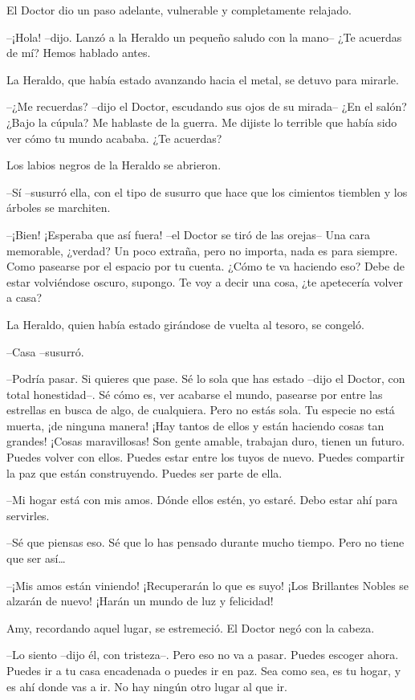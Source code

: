 {El Doctor dio un paso adelante, vulnerable y completamente relajado.}

{--¡Hola! --dijo. Lanzó a la Heraldo un pequeño saludo con la mano--
¿Te acuerdas de mí? Hemos hablado antes.}

{La Heraldo, que había estado avanzando hacia el metal, se detuvo para
mirarle.}

{--¿Me recuerdas? --dijo el Doctor, escudando sus ojos de su mirada--
	¿En el salón? ¿Bajo la cúpula? Me hablaste de la guerra. Me dijiste lo
terrible que había sido ver cómo tu mundo acababa. ¿Te acuerdas?}

{Los labios negros de la Heraldo se abrieron.}

{--Sí --susurró ella, con el tipo de susurro que hace que los
cimientos tiemblen y los árboles se marchiten.}

{--¡Bien! ¡Esperaba que así fuera! --el Doctor se tiró de las orejas--
	Una cara memorable, ¿verdad? Un poco extraña, pero no importa, nada es
	para siempre. Como pasearse por el espacio por tu cuenta. ¿Cómo te va
	haciendo eso? Debe de estar volviéndose oscuro, supongo. Te voy a decir
una cosa, ¿te apetecería volver a casa?}

{La Heraldo, quien había estado girándose de vuelta al tesoro, se
congeló.}

{--Casa --susurró.}

{--Podría pasar. Si quieres que pase. Sé lo sola que has estado --dijo
	el Doctor, con total honestidad--. Sé cómo es, ver acabarse el mundo,
	pasearse por entre las estrellas en busca de algo, de cualquiera. Pero
	no estás sola. Tu especie no está muerta, ¡de ninguna manera! ¡Hay
	tantos de ellos y están haciendo cosas tan grandes! ¡Cosas maravillosas!
	Son gente amable, trabajan duro, tienen un futuro. Puedes volver con
	ellos. Puedes estar entre los tuyos de nuevo. Puedes compartir la paz
que están construyendo. Puedes ser parte de ella.}

{--Mi hogar está con mis amos. Dónde ellos estén, yo estaré. Debo
estar ahí para servirles.}

{--Sé que piensas eso. Sé que lo has pensado durante mucho tiempo.
	Pero no tiene que ser así\ldots{}}

{--¡Mis amos están viniendo! ¡Recuperarán lo que es suyo! ¡Los
	Brillantes Nobles se alzarán de nuevo! ¡Harán un mundo de luz y
felicidad!}

{Amy, recordando aquel lugar, se estremeció. El Doctor negó con la
cabeza.}

{--Lo siento --dijo él, con tristeza--. Pero eso no va a pasar. Puedes
	escoger ahora. Puedes ir a tu casa encadenada o puedes ir en paz. Sea
	como sea, es tu hogar, y es ahí donde vas a ir. No hay ningún otro lugar
al que ir.}

